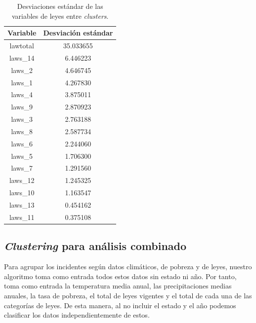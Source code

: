 \documentclass[11pt,a4paper]{article}
\begin{document}
\begin{table}[H]
    \centering
\begin{tabular}{|c|c|}
\hline
\textbf{Variable} & \textbf{Desviación estándar} \\ \hline
lawtotal          & 35.033655                    \\ \hline
laws\_14          & 6.446223                     \\ \hline
laws\_2           & 4.646745                     \\ \hline
laws\_1           & 4.267830                     \\ \hline
laws\_4           & 3.875011                     \\ \hline
laws\_9           & 2.870923                     \\ \hline
laws\_3           & 2.763188                     \\ \hline
laws\_8           & 2.587734                     \\ \hline
laws\_6           & 2.244060                     \\ \hline
laws\_5           & 1.706300                     \\ \hline
laws\_7           & 1.291560                     \\ \hline
laws\_12          & 1.245325                     \\ \hline
laws\_10          & 1.163547                     \\ \hline
laws\_13          & 0.454162                     \\ \hline
laws\_11          & 0.375108                     \\ \hline
\end{tabular}
    \caption{Desviaciones estándar de las variables de leyes entre \textit{clusters}.}
    \label{tab:leyes_std}
\end{table}

\subsection{\textit{Clustering} para análisis combinado}

Para agrupar los incidentes según datos climáticos, de pobreza y de leyes, nuestro algoritmo toma como entrada todos estos datos sin estado ni año. Por tanto, toma como entrada la temperatura media anual, las precipitaciones medias anuales, la tasa de pobreza, el total de leyes vigentes y el total de cada una de las categorías de leyes. De esta manera, al no incluir el estado y el año podemos clasificar los datos independientemente de estos.
\end{document}
